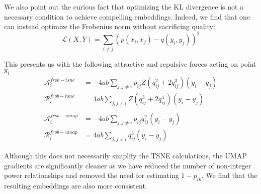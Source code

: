 \documentclass[sigconf, nonacm]{acmart}
\begin{document}
We also point out the curious fact that optimizing the KL divergence is not a necessary condition to achieve compelling embeddings. Indeed, we find that one can
instead optimize the Frobenius norm without sacrificing quality:
\[ \mathcal{L}(X, Y) = \sum_{i \neq j} (p(x_i, x_j) - q(y_i, y_j))^2 \]

This presents us with the following attractive and repulsive forces acting on point $y_i$
\begin{align*}
    \mathcal{A}_i^{frob-tsne} &= -4ab \sum_{j, j \neq i} p_{ij} Z (q_{ij}^2 + 2q_{ij}^3) (y_i - y_j) \\
    \mathcal{R}_i^{frob-tsne} &= 4ab \sum_{j, j \neq i} Z( q_{ij}^3 + 2q_{ij}^4) (y_i - y_j) \\
    &\\
    \mathcal{A}_i^{frob-umap} &= -4ab \sum_{j, j \neq i} p_{ij} q_{ij}^2 (y_i - y_j) \\
    \mathcal{R}_i^{frob-umap} &= 4ab \sum_{j, j \neq i} q_{ij}^3 (y_i - y_j)  
\end{align*}

Although this does not necessarily simplify the TSNE calculations, the UMAP gradients are significantly cleaner as we have reduced the number of non-integer
power relationships and removed the need for estimating $1 - p_{ik}$. We find that the resulting embeddings are also more consistent.
\end{document}

